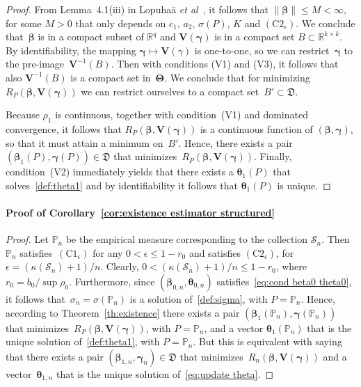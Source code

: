 \documentclass{article}
\numberwithin{equation}{section}
\theoremstyle{plain}
\newcommand{\R}{\mathbb{R}}
\newcommand{\bbeta}{\bm\beta}
\newcommand{\btheta}{\bm\theta}
\newcommand{\bgamma}{\bm\gamma}
\newcommand{\bTheta}{\bm\Theta}
\newcommand{\bV}{\mathbf{V}}
\begin{document}
\begin{proof}
From Lemma~4.1(iii) in Lopuha\"a \textit{et al}~\cite{lopuhaa-gares-ruizgazen2023}, 
it follows that $\|\bbeta\|\leq M<\infty$, for some $M>0$ that only depends on $c_1$, $a_2$, $\sigma(P)$, $K$ and $(\text{C2}_\epsilon)$.
We conclude that~$\bbeta$ is in a compact subset of $\R^q$ and $\bV(\bgamma)$ 
is in a compact set $B\subset \R^{k\times k}$.
By identifiability, the mapping $\bgamma\mapsto \bV(\gamma)$ is one-to-one, 
so we can restrict~$\bgamma$ to the pre-image~$\bV^{-1}(B)$.
Then with conditions (V1) and (V3), it follows that also $\bV^{-1}(B)$ is a compact set in~$\bTheta$.
We conclude that for minimizing $R_P(\bbeta,\bV(\bgamma))$
we can restrict ourselves to a compact set~$B'\subset \mathfrak{D}$.

Because $\rho_1$ is continuous, together with condition~(V1) and dominated convergence,
it follows that $R_P(\bbeta,\bV(\bgamma))$ is a continuous function of
$(\bbeta,\bgamma)$, so that it must attain a minimum on~$B'$.
Hence, there exists a pair $(\bbeta_1(P),\bgamma(P))\in \mathfrak{D}$ that minimizes~$R_P(\bbeta,\bV(\bgamma))$.
Finally, condition~(V2) immediately yields that there exists a $\btheta_1(P)$ that solves~\eqref{def:theta1}
and by identifiability it follows that $\btheta_1(P)$ is unique.
\end{proof}

\paragraph*{Proof of Corollary~\ref{cor:existence estimator structured}}
\begin{proof}
Let $\mathbb{P}_n$ be the empirical measure corresponding to the collection $\mathcal{S}_n$.
Then~$\mathbb{P}_n$ satisfies~$(\text{C1}_\epsilon)$ for any $0<\epsilon\leq 1-r_0$ and
satisfies $(\text{C2}_\epsilon)$, for $\epsilon=(\kappa(\mathcal{S}_n)+1)/n$.
Clearly, $0<(\kappa(\mathcal{S}_n)+1)/n\leq 1-r_0$, where $r_0=b_0/\sup\rho_0$.
Furthermore, since $(\bbeta_{0,n},\btheta_{0,n})$ satisfies~\eqref{eq:cond beta0 theta0},
it follows that~$\sigma_n=\sigma(\mathbb{P}_n)$ is a solution of~\eqref{def:sigma}, with $P=\mathbb{P}_n$.
Hence, according to Theorem~\ref{th:existence} there exists 
a pair $(\bbeta_1(\mathbb{P}_n),\bgamma(\mathbb{P}_n))$ that minimizes~$R_P(\bbeta,\bV(\bgamma))$, with $P=\mathbb{P}_n$,
and a vector $\btheta_1(\mathbb{P}_n)$ that is the unique solution of~\eqref{def:theta1}, with $P=\mathbb{P}_n$.
But this is equivalent with saying that there exists a pair $(\bbeta_{1,n},\bgamma_n)\in \mathfrak{D}$ that minimizes~$R_n(\bbeta,\bV(\bgamma))$
and a vector~$\btheta_{1,n}$ that is the unique solution of~\eqref{eq:update theta}.
\end{proof}
\end{document}
